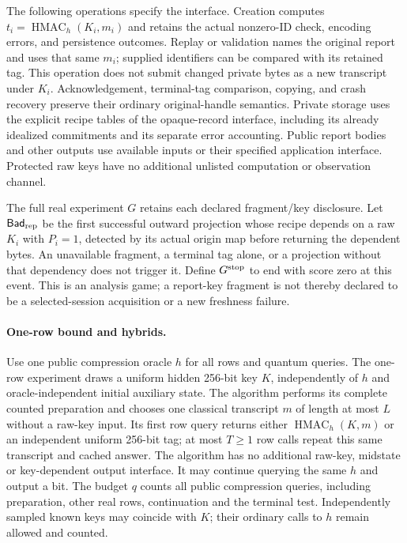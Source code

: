 The following operations specify the interface.  Creation computes
$t_i=\operatorname{HMAC}_h(K_i,m_i)$ and retains the actual nonzero-ID check,
encoding errors, and persistence outcomes.  Replay or validation names the
original report and uses that same $m_i$; supplied identifiers can be compared
with its retained tag.  This operation does not submit changed private bytes
as a new transcript under $K_i$.  Acknowledgement, terminal-tag comparison,
copying, and crash recovery preserve their ordinary original-handle semantics.
Private storage uses the explicit recipe tables of the opaque-record
interface, including its already idealized commitments and its separate error
accounting.  Public report bodies and other outputs use available inputs or
their specified application interface.  Protected raw keys have no additional
unlisted computation or observation channel.

The full real experiment $G$ retains each declared fragment/key disclosure.
Let $\mathsf{Bad}_{\rm rep}$ be the first successful outward projection whose
recipe depends on a raw $K_i$ with $P_i=1$, detected by its actual origin map
before returning the dependent bytes.  An unavailable fragment, a terminal
tag alone, or a projection without that dependency does not trigger it.
Define $G^{\rm stop}$ to end with score zero at this event.  This is an
analysis game; a report-key fragment is not thereby declared to be a
selected-session acquisition or a new freshness failure.

\paragraph{One-row bound and hybrids.}
Use one public compression oracle $h$ for all rows and quantum queries.
The one-row experiment draws a uniform hidden 256-bit key $K$, independently
of $h$ and oracle-independent initial auxiliary state. The algorithm performs
its complete counted preparation and chooses one classical transcript $m$ of
length at most $L$ without a raw-key input. Its first row query returns either
$\operatorname{HMAC}_h(K,m)$ or an independent uniform 256-bit tag; at most
$T\ge1$ row calls repeat this same transcript and cached answer. The algorithm
has no additional raw-key, midstate or key-dependent output interface.
It may continue querying the same $h$ and output a bit. The budget $q$ counts
all public compression queries, including preparation, other real rows,
continuation and the terminal test. Independently sampled known keys may
coincide with $K$; their ordinary calls to $h$ remain allowed and counted.

